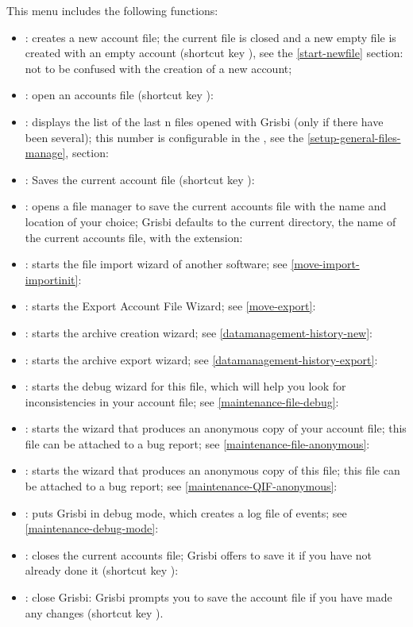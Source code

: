 This menu includes the following functions:
\begin{itemize}
	\item {}: creates a new account file; the current file is closed and a new empty file is created with an empty account (shortcut key ),  see the \vref{start-newfile} section: not to be confused with the creation of a new account;
	\item {}: open an accounts file  (shortcut key  ):
	\item {}: displays the list of the last n files opened with Grisbi (only if there have been several); this number is configurable in the , see the \vref{setup-general-files-manage},  section:
	\item {}: Saves the current account file  (shortcut key ):
	\item {}: opens a file manager to save the current accounts file with the name and location of your choice; Grisbi defaults to the current directory, the name of the current accounts file, with the  extension:
	\item {}: starts the file import wizard of another software; see  \vref{move-import-importinit}:
	\item {}: starts the Export Account File Wizard; see \vref{move-export}:	
	\item {}: starts the archive creation wizard; see \vref{datamanagement-history-new}:	
	\item {}: starts the archive export wizard; see \vref{datamanagement-history-export}:
	\item {}: starts the debug wizard for this file, which will help you look for inconsistencies in your account file; see  \vref{maintenance-file-debug}:
	\item {}: starts the wizard that produces an anonymous copy of your account file; this file can be attached to a bug report; see \vref{maintenance-file-anonymous}:	
	\item {}: starts the wizard that produces an anonymous copy of this file; this file can be attached to a bug report; see \vref{maintenance-QIF-anonymous}:	
	\item {}: puts Grisbi in debug mode, which creates a log file of events; see \vref{maintenance-debug-mode}: 	
	\item {}: closes the current accounts file; Grisbi offers to save it if you have not already done it (shortcut key ):
	\item {}: close Grisbi: Grisbi prompts you to save the account file if you have made any changes (shortcut key ).
\end{itemize}


